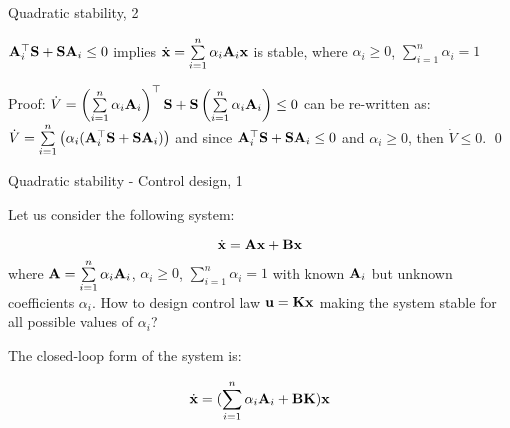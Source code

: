 \documentclass{beamer}
\begin{document}
\begin{frame}{Quadratic stability, 2}
	\begin{flushleft}
		
		\begin{theorem}
			$\mathbf{A}_i^\top \mathbf{S} + \mathbf{S} \mathbf{A}_i \leq 0$ implies $\dot{\mathbf{x}} = \sum\limits_{i=1}^{n} \alpha_i \mathbf{A}_i \mathbf{x}$ is stable, where $\alpha_i \geq 0$, $\sum\limits_{i=1}^{n} \alpha_i = 1$
		\end{theorem}
		
		\bigskip
		
		Proof: $\dot V = \left(\sum\limits_{i=1}^{n} \alpha_i \mathbf{A}_i \right)^\top \mathbf{S} + \mathbf{S} 
		\left( \sum\limits_{i=1}^{n} \alpha_i \mathbf{A}_i \right) \leq 0$ can be re-written as: 
		$\dot V = \sum\limits_{i=1}^{n} \left( \alpha_i (\mathbf{A}_i^\top \mathbf{S} + \mathbf{S} \mathbf{A}_i) \right) $ and since $\mathbf{A}_i^\top \mathbf{S} + \mathbf{S} \mathbf{A}_i \leq 0$ and $\alpha_i \geq 0$, then $\dot V \leq 0$. \qed
		
	\end{flushleft}
\end{frame}




\begin{frame}{Quadratic stability - Control design, 1}
	\begin{flushleft}
		
		Let us consider the following system:
		
		\begin{equation}
			\dot{\mathbf{x}} = \mathbf{A}\mathbf{x} + \mathbf{B}\mathbf{x}
		\end{equation}
		where $\mathbf{A} = \sum\limits_{i=1}^{n} \alpha_i \mathbf{A}_i$, $\alpha_i \geq 0$, $\sum\limits_{i=1}^{n} \alpha_i = 1$ with known $\mathbf{A}_i$ but unknown coefficients $\alpha_i$. How to design control law $\mathbf{u} = \mathbf{K}\mathbf{x}$ making the system stable for all possible values of $\alpha_i$? 
		
		\bigskip
		
		The closed-loop form of the system is:
		
		\begin{equation}
			\dot{\mathbf{x}} = (\sum\limits_{i=1}^{n} \alpha_i \mathbf{A}_i + \mathbf{B}\mathbf{K})\mathbf{x}
		\end{equation}
		
		
	\end{flushleft}
\end{frame}
\end{document}
